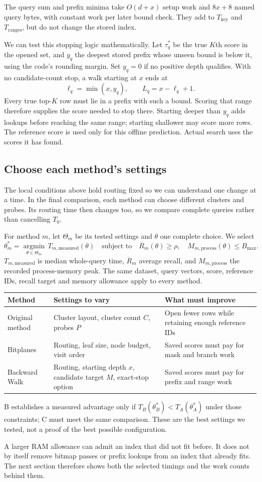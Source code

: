 The query sum and prefix minima take $O(d+x)$ setup work and $8x+8$ named query bytes, with constant work per later bound check. They add to $T_{\mathrm{key}}$ and $T_{\mathrm{ranges}}$, but do not change the stored index.

We can test this stopping logic mathematically. Let $\tau_q^*$ be the true $K$th score in the opened set, and $y_q$ the deepest stored prefix whose unseen bound is below it, using the code's rounding margin. Set $y_q=0$ if no positive depth qualifies. With no candidate-count stop, a walk starting at $x$ ends at
\[
 \boxed{\ell_q=\min(x,y_q),\qquad L_q=x-\ell_q+1.}
\]
Every true top-$K$ row must lie in a prefix with such a bound. Scoring that range therefore supplies the score needed to stop there. Starting deeper than $y_q$ adds lookups before reaching the same range; starting shallower may score more rows. The reference score is used only for this offline prediction. Actual search uses the scores it has found.

\subsection{Choose each method's settings}
The local conditions above hold routing fixed so we can understand one change at a time. In the final comparison, each method can choose different clusters and probes. Its routing time then changes too, so we compare complete queries rather than cancelling $T_0$.

For method $m$, let $\Theta_m$ be its tested settings and $\theta$ one complete choice. We select
\[
 \boxed{\theta_m^*=\underset{\theta\in\Theta_m}{\operatorname{argmin}}\,
 T_{m,\mathrm{measured}}(\theta)}
 \quad\text{subject to}\quad
 \overline R_m(\theta)\ge\rho,\quad
 M_{m,\mathrm{process}}(\theta)\le B_{\max}.
\]
$T_{m,\mathrm{measured}}$ is median whole-query time, $\overline R_m$ average recall, and $M_{m,\mathrm{process}}$ the recorded process-memory peak. The same dataset, query vectors, score, reference IDs, recall target and memory allowance apply to every method.

\begin{center}\small
\begin{tabularx}{\linewidth}{@{}lYY@{}}\toprule
Method & Settings to vary & What must improve\\\midrule
Original method & Cluster layout, cluster count $C$, probes $P$ & Open fewer rows while retaining enough reference IDs\\
Bitplanes & Routing, leaf size, node budget, visit order & Saved scores must pay for mask and branch work\\
Backward Walk & Routing, starting depth $x$, candidate target $M$, exact-stop option & Saved scores must pay for prefix and range work\\\bottomrule
\end{tabularx}
\end{center}
B establishes a measured advantage only if $T_B(\theta_B^*)<T_A(\theta_A^*)$ under those constraints; C must meet the same comparison. These are the best settings we tested, not a proof of the best possible configuration.

A larger RAM allowance can admit an index that did not fit before. It does not by itself remove bitmap passes or prefix lookups from an index that already fits. The next section therefore shows both the selected timings and the work counts behind them.
